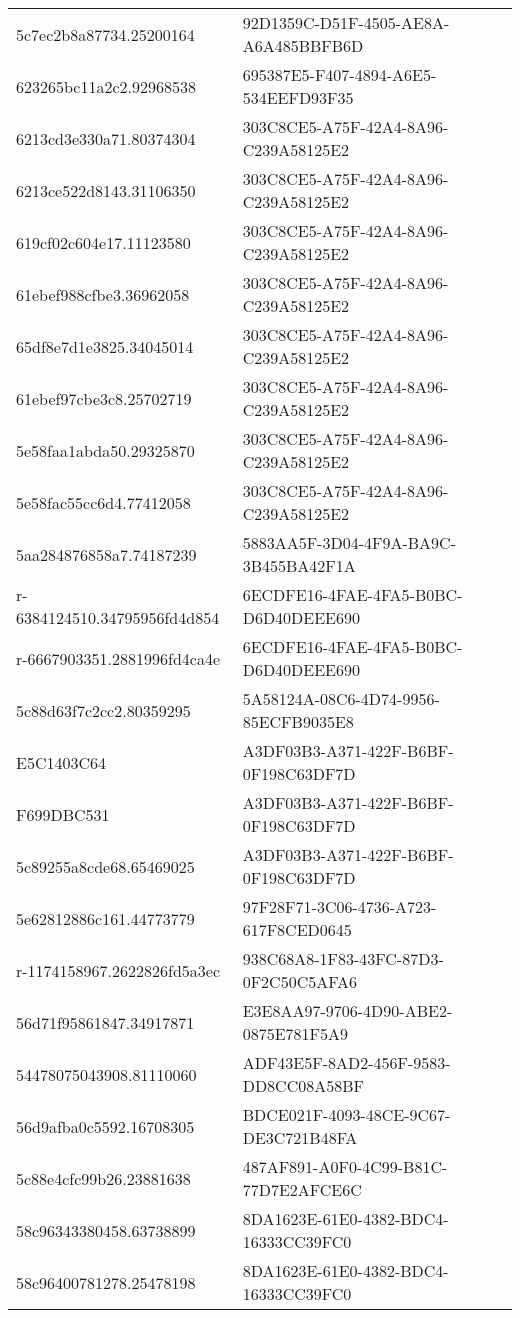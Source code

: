 \begin{tabular}{ll}
5c7ec2b8a87734.25200164 & 92D1359C-D51F-4505-AE8A-A6A485BBFB6D \\
623265bc11a2c2.92968538 & 695387E5-F407-4894-A6E5-534EEFD93F35 \\
6213cd3e330a71.80374304 & 303C8CE5-A75F-42A4-8A96-C239A58125E2 \\
6213ce522d8143.31106350 & 303C8CE5-A75F-42A4-8A96-C239A58125E2 \\
619cf02c604e17.11123580 & 303C8CE5-A75F-42A4-8A96-C239A58125E2 \\
61ebef988cfbe3.36962058 & 303C8CE5-A75F-42A4-8A96-C239A58125E2 \\
65df8e7d1e3825.34045014 & 303C8CE5-A75F-42A4-8A96-C239A58125E2 \\
61ebef97cbe3c8.25702719 & 303C8CE5-A75F-42A4-8A96-C239A58125E2 \\
5e58faa1abda50.29325870 & 303C8CE5-A75F-42A4-8A96-C239A58125E2 \\
5e58fac55cc6d4.77412058 & 303C8CE5-A75F-42A4-8A96-C239A58125E2 \\
5aa284876858a7.74187239 & 5883AA5F-3D04-4F9A-BA9C-3B455BA42F1A \\
r-6384124510.34795956fd4d854 & 6ECDFE16-4FAE-4FA5-B0BC-D6D40DEEE690 \\
r-6667903351.2881996fd4ca4e & 6ECDFE16-4FAE-4FA5-B0BC-D6D40DEEE690 \\
5c88d63f7c2cc2.80359295 & 5A58124A-08C6-4D74-9956-85ECFB9035E8 \\
E5C1403C64 & A3DF03B3-A371-422F-B6BF-0F198C63DF7D \\
F699DBC531 & A3DF03B3-A371-422F-B6BF-0F198C63DF7D \\
5c89255a8cde68.65469025 & A3DF03B3-A371-422F-B6BF-0F198C63DF7D \\
5e62812886c161.44773779 & 97F28F71-3C06-4736-A723-617F8CED0645 \\
r-1174158967.2622826fd5a3ec & 938C68A8-1F83-43FC-87D3-0F2C50C5AFA6 \\
56d71f95861847.34917871 & E3E8AA97-9706-4D90-ABE2-0875E781F5A9 \\
54478075043908.81110060 & ADF43E5F-8AD2-456F-9583-DD8CC08A58BF \\
56d9afba0c5592.16708305 & BDCE021F-4093-48CE-9C67-DE3C721B48FA \\
5c88e4cfc99b26.23881638 & 487AF891-A0F0-4C99-B81C-77D7E2AFCE6C \\
58c96343380458.63738899 & 8DA1623E-61E0-4382-BDC4-16333CC39FC0 \\
58c96400781278.25478198 & 8DA1623E-61E0-4382-BDC4-16333CC39FC0 \\

\end{tabular}
